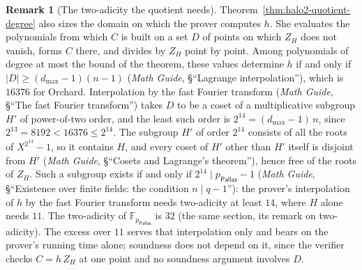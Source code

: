 \documentclass[11pt,a4paper]{article}
\theoremstyle{definition}
\newtheorem{remark}[theorem]{Remark}
\newcommand{\F}{\mathbb{F}}
\newcommand{\Pallas}{\ensuremath{\mathsf{Pallas}}}
\newcommand{\ZH}{Z_H}
\begin{document}
\begin{remark}[The two-adicity the quotient needs]\label{rem:halo2-twoadic}
Theorem~\ref{thm:halo2-quotient-degree} also sizes the domain on which the
prover computes $h$. She evaluates the polynomials from which $C$ is built
on a set $D$ of points on which $\ZH$ does not vanish, forms $C$ there, and
divides by $\ZH$ point by point. Among polynomials of degree at most the
bound of the theorem, these values determine $h$ if and only if
$|D| \ge (d_{\max} - 1)(n - 1)$ (\emph{Math Guide}, \S``Lagrange
interpolation''), which is $16376$ for Orchard. Interpolation by the
fast Fourier transform (\emph{Math Guide}, \S``The fast Fourier
transform'') takes $D$ to be a coset of a multiplicative subgroup $H'$ of
power-of-two order, and the least such order is
$2^{14} = (d_{\max} - 1)\,n$, since $2^{13} = 8192 < 16376 \le 2^{14}$.
The subgroup $H'$ of order $2^{14}$ consists of all the roots of
$X^{2^{14}} - 1$, so it contains $H$, and every coset of $H'$ other than
$H'$ itself is disjoint from $H'$ (\emph{Math Guide}, \S``Cosets and
Lagrange's theorem''), hence free of the roots of $\ZH$. Such a subgroup
exists if and only if $2^{14} \mid p_{\Pallas} - 1$ (\emph{Math Guide},
\S``Existence over finite fields: the condition $n \mid q-1$''): the
prover's interpolation of $h$ by the fast Fourier transform needs
two-adicity at least $14$, where $H$ alone needs $11$. The two-adicity of
$\F_{p_{\Pallas}}$ is $32$ (the same section, its remark on two-adicity).
The excess over $11$ serves that interpolation only and bears on the
prover's running time alone; soundness does not depend on it, since the
verifier checks $C = h\,\ZH$ at one point and no soundness argument
involves $D$.
\end{remark}
\end{document}
